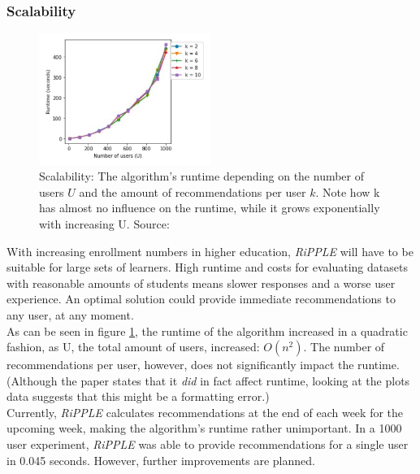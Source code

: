 \documentclass[conference]{IEEEtran}
\begin{document}
\subsubsection{Scalability} \label{paper:scalability}
\begin{figure}[!t]
	\centering
	\includegraphics[width=0.5\textwidth]{g/Runtime.PNG}
	\caption{Scalability: The algorithm's runtime depending on the number of users \(U\) and the amount of recommendations per user \(k\). Note how k has almost no influence on the runtime, while it grows exponentially with increasing U. Source: \cite{potts2018reciprocal}}
	\label{f:scalability}
\end{figure}
With increasing enrollment numbers in higher education, \textit{RiPPLE} will have to be suitable for large sets of learners. High runtime and costs for evaluating datasets with reasonable amounts of students means slower responses and a worse user experience. An optimal solution could provide immediate recommendations to any user, at any moment.\\
As can be seen in figure \ref{f:scalability}, the runtime of the algorithm increased in a quadratic fashion, as U, the total amount of users, increased: \(O(n^2)\). The number of recommendations per user, however, does not significantly impact the runtime. (Although the paper states that it \textit{did} in fact affect runtime, looking at the plots data suggests that this might be a formatting error.)\\
Currently, \textit{RiPPLE} calculates recommendations at the end of each week for the upcoming week, making the algorithm's runtime rather unimportant. In a 1000 user experiment, \textit{RiPPLE} was able to provide recommendations for a single user in 0.045 seconds. However, further improvements are planned.\\
\end{document}
